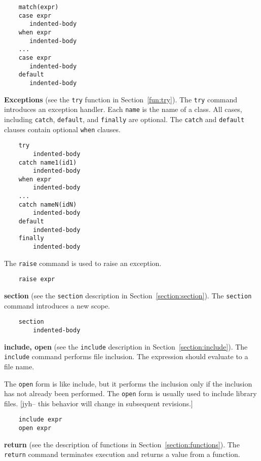 \begin{verbatim}
    match(expr)
    case expr
       indented-body
    when expr
       indented-body
    ...
    case expr
       indented-body
    default
       indented-body
\end{verbatim}

\textbf{Exceptions} (see the \verb+try+ function in Section~\ref{fun:try}).  The \verb+try+ command
introduces an exception handler.  Each \verb+name+ is the name of a class.  All cases, including
\verb+catch+, \verb+default+, and \verb+finally+ are optional.  The \verb+catch+ and \verb+default+
clauses contain optional \verb+when+ clauses.

\begin{verbatim}
    try
        indented-body
    catch name1(id1)
        indented-body
    when expr
        indented-body
    ...
    catch nameN(idN)
        indented-body
    default
        indented-body
    finally
        indented-body
\end{verbatim}

The \verb+raise+ command is used to raise an exception.

\begin{verbatim}
    raise expr
\end{verbatim}        

\textbf{section} (see the \verb+section+ description in Section~\ref{section:section}).  The \verb+section+ command
introduces a new scope.

\begin{verbatim}
    section
        indented-body
\end{verbatim}

\textbf{include, open} (see the \verb+include+ description in Section~\ref{section:include}).  The \verb+include+ command
performs file inclusion.  The expression should evaluate to a file name.

The \verb+open+ form is like include, but it performs the inclusion only if the inclusion has not
already been performed.  The \verb+open+ form is usually used to include library files.  [jyh-- this
behavior will change in subsequent revisions.]

\begin{verbatim}
    include expr
    open expr
\end{verbatim}

\textbf{return} (see the description of functions in Section~\ref{section:functions}).  The \verb+return+ command
terminates execution and returns a value from a function.

